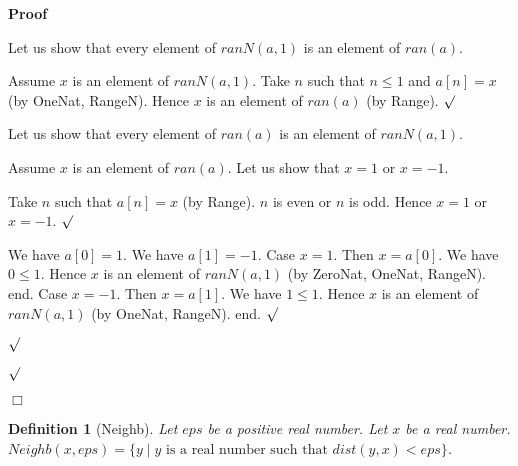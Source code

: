 \documentclass{article}
\newenvironment{forthel}{\begin{leftbar}}{\end{leftbar}}
\newenvironment{proof}{\noindent\textbf{Proof\ }}{\hspace*{\fill}$\Box$\medskip}
\newenvironment{subproof}{\begin{list}{}{}
		\item[\text{Proof}]}{\hfill $\surd$ \end{list}}
\newtheorem{definition}{Definition}
\begin{document}
\begin{forthel}
\begin{proof}
\begin{subproof}
\begin{subproof}
	Let us show that every element of $ranN(a,1)$ is an element of $ran(a)$.
	\begin{subproof}
	Assume $x$ is an element of $ranN(a,1)$.
	Take $n$ such that $n \leq 1$ and $a[n] = x$ (by OneNat, RangeN).
	Hence $x$ is an element of $ran(a)$ (by Range).
	\end{subproof}
	Let us show that every element of $ran(a)$ is an element of $ranN(a,1)$.
	\begin{subproof}
	Assume $x$ is an element of $ran(a)$.
	Let us show that $x = 1$ or $x = -1$.
	\begin{subproof}
	Take $n$ such that $a[n] = x$ (by Range).
	$n$ is even or $n$ is odd.
	Hence $x = 1$ or $x = -1$.
	\end{subproof}
	We have $a[0] = 1$.
	We have $a[1] = -1$.
	Case $x = 1$.
	Then $x = a[0]$.
	We have $0 \leq 1$.
	Hence $x$ is an element of $ranN(a,1)$ (by ZeroNat, OneNat, RangeN).
	end.
	Case $x = -1$.
	Then $x = a[1]$.
	We have $1 \leq 1$.
	Hence $x$ is an element of $ranN(a,1)$ (by OneNat, RangeN).
	end.
	\end{subproof}
	\end{subproof}
	\end{subproof}
	\end{proof}
	
	\begin{definition} [Neighb]
	Let $eps$ be a positive real number. Let $x$ be a real number.
	$Neighb(x,eps) = \{y \mid y \text{ is a real number such that } dist(y,x) < eps\}$.
	\end{definition}
	

\end{forthel}
\end{document}
